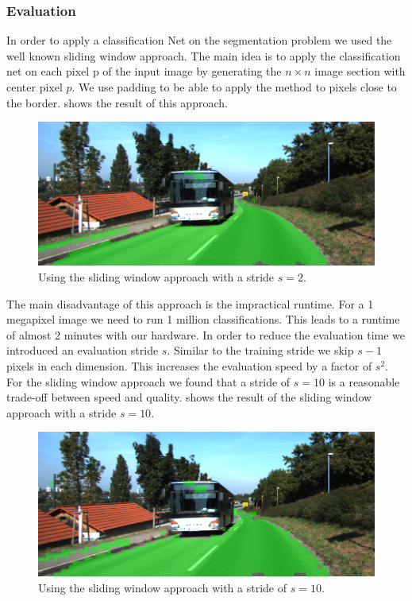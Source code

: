 \subsubsection{Evaluation}

In order to apply a classification Net on the segmentation problem we used the well known sliding window approach. The main idea is to apply the classification net on each pixel p of the input image by generating the $n \times n$ image section with center pixel $p$. We use padding to be able to apply the method to pixels close to the border.  shows the result of this approach.

\begin{figure}[H]
	\centering
	\includegraphics[width=\columnwidth]{figures/models/testing2-um_32_sliding_stride2.png}
	\caption{Using the sliding window approach with a stride $s=2$.}
	\label{fig:stride2}
\end{figure}

The main disadvantage of this approach is the impractical runtime. For a 1 megapixel image we need to run 1 million classifications. This leads to a runtime of almost 2 minutes with our hardware. In order to reduce the evaluation time we introduced an evaluation stride $s$. Similar to the training stride we skip $s-1$ pixels in each dimension. This increases the evaluation speed by a factor of $s^2$. For the sliding window approach we found that a stride of $s = 10$ is a reasonable trade-off between speed and quality.  shows the result of the sliding window approach with a stride $s=10$.



\begin{figure}[]
	\centering
	\includegraphics[width=\columnwidth]{figures/models/testing2-um_32_sliding_stride10.png}
	\caption{Using the sliding window approach with a stride of $s=10$.}
	\label{fig:stride10}
\end{figure}


